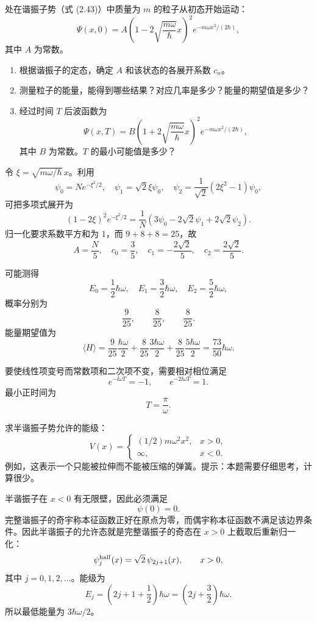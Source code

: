 \begin{question}
处在谐振子势（式 (2.43)）中质量为 $m$ 的粒子从初态开始运动：
\[
\Psi(x,0)=A\left(1-2\sqrt{\frac{m\omega}{\hbar}}x\right)^2 e^{-m\omega x^2/(2\hbar)},
\]
其中 $A$ 为常数。
\begin{enumerate}
\item 根据谐振子的定态，确定 $A$ 和该状态的各展开系数 $c_n$。
\item 测量粒子的能量，能得到哪些结果？对应几率是多少？能量的期望值是多少？
\item 经过时间 $T$ 后波函数为
\[
\Psi(x,T)=B\left(1+2\sqrt{\frac{m\omega}{\hbar}}x\right)^2 e^{-m\omega x^2/(2\hbar)},
\]
其中 $B$ 为常数。$T$ 的最小可能值是多少？
\end{enumerate}

\par\smallskip
{}

\end{question}
\begin{solution}
令 $\xi=\sqrt{m\omega/\hbar}\,x$。利用
\[
\psi_0=N e^{-\xi^2/2},\quad
\psi_1=\sqrt2\xi\psi_0,
\quad
\psi_2=\frac1{\sqrt2}(2\xi^2-1)\psi_0,
\]
可把多项式展开为
\[
(1-2\xi)^2e^{-\xi^2/2}
=\frac1N\left(3\psi_0-2\sqrt2\psi_1+2\sqrt2\psi_2\right).
\]
归一化要求系数平方和为 $1$，而 $9+8+8=25$，故
\[
A=\frac{N}{5},
\quad
c_0=\frac35,
\quad
c_1=-\frac{2\sqrt2}{5},
\quad
c_2=\frac{2\sqrt2}{5}.
\]

可能测得
\[
E_0=\frac12\hbar\omega,
\quad E_1=\frac32\hbar\omega,
\quad E_2=\frac52\hbar\omega,
\]
概率分别为
\[
\frac9{25},\qquad \frac8{25},\qquad \frac8{25}.
\]
能量期望值为
\[
\langle H\rangle=\frac9{25}\frac{\hbar\omega}{2}
+\frac8{25}\frac{3\hbar\omega}{2}
+\frac8{25}\frac{5\hbar\omega}{2}
=\frac{73}{50}\hbar\omega.
\]

要使线性项变号而常数项和二次项不变，需要相对相位满足
\[
e^{-\ii\omega T}=-1,
\qquad e^{-2\ii\omega T}=1.
\]
最小正时间为
\[
T=\frac{\pi}{\omega}.
\]
\end{solution}

\begin{question}
求半谐振子势允许的能级：
\[
V(x)=\begin{cases}(1/2)m\omega^2x^2,&x>0,\\ \infty,&x<0.
\end{cases}
\]
例如，这表示一个只能被拉伸而不能被压缩的弹簧。提示：本题需要仔细思考，计算很少。
\end{question}
\begin{solution}
半谐振子在 $x<0$ 有无限壁，因此必须满足
\[
\psi(0)=0.
\]
完整谐振子的奇宇称本征函数正好在原点为零，而偶宇称本征函数不满足该边界条件。因此半谐振子的允许态就是完整谐振子的奇态在 $x>0$ 上截取后重新归一化：
\[
\psi^{\rm half}_j(x)=\sqrt2\,\psi_{2j+1}(x),\qquad x>0,
\]
其中 $j=0,1,2,\ldots$。能级为
\[
E_j=\left(2j+1+\frac12\right)\hbar\omega
=\left(2j+\frac32\right)\hbar\omega.
\]
所以最低能量为 $3\hbar\omega/2$。
\end{solution}

